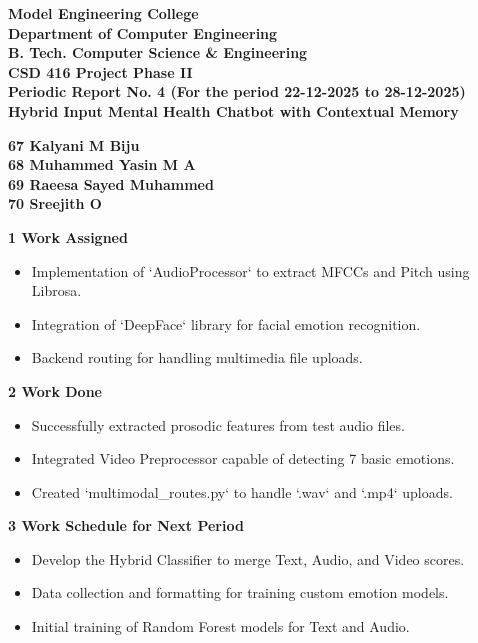 \documentclass[12pt,a4paper]{article}
\begin{document}
\vfill
\newpage


\begin{center}
{\Large \textbf{Model Engineering College}}\\[0.2em]
{\large \textbf{Department of Computer Engineering}}\\[0.2em]
{\large \textbf{B. Tech. Computer Science \& Engineering}}\\[0.2em]
{\large \textbf{CSD 416 Project Phase II}}\\[1em]
{\large \textbf{Periodic Report No. 4 (For the period 22-12-2025 to 28-12-2025)}}\\[1.5em]

{\Large \textbf{Hybrid Input Mental Health Chatbot with Contextual Memory}}\\[0.2em]

\end{center}

\begin{center}
\textbf{67  Kalyani M Biju\\
68 Muhammed Yasin M A\\
69 Raeesa Sayed Muhammed\\
70 Sreejith O\\[1.5em]}
\end{center}

\noindent\textbf{1 \quad Work Assigned}
\begin{itemize}
    \item Implementation of `AudioProcessor` to extract MFCCs and Pitch using Librosa.
    \item Integration of `DeepFace` library for facial emotion recognition.
    \item Backend routing for handling multimedia file uploads.
\end{itemize}

\noindent\textbf{2 \quad Work Done}
\begin{itemize}
    \item Successfully extracted prosodic features from test audio files.
    \item Integrated Video Preprocessor capable of detecting 7 basic emotions.
    \item Created `multimodal_routes.py` to handle `.wav` and `.mp4` uploads.
\end{itemize}

\noindent\textbf{3 \quad Work Schedule for Next Period}
\begin{itemize}
    \item Develop the Hybrid Classifier to merge Text, Audio, and Video scores.
    \item Data collection and formatting for training custom emotion models.
    \item Initial training of Random Forest models for Text and Audio.
\end{itemize}
\end{document}
